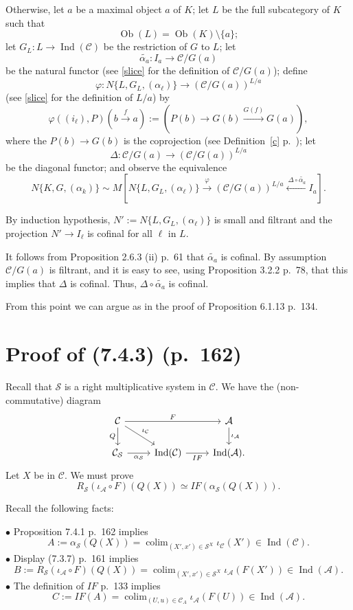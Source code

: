 \documentclass[12pt]{article}
\theoremstyle{remark}
\theoremstyle{definition}
\newcommand{\bu}{\bullet}
\newcommand{\A}{\mathcal A}
\newcommand{\C}{\mathcal C}
\newcommand{\SSS}{\mathcal S}
\newcommand{\xr}{\xrightarrow}
\newcommand{\cn}{(See (\ref{convnot}) p.~\pageref{convnot} for an explanation of the notation.) }
\DeclareMathOperator*{\coli}{colim}
\DeclareMathOperator{\Ind}{Ind}
\DeclareMathOperator{\Ob}{Ob}
\begin{document}
Otherwise, let $a$ be a maximal object $a$ of $K$; let $L$ be the full subcategory of $K$ such that 
$$
\Ob(L)=\Ob(K)\setminus\{a\};
$$ 
let $G_L:L\to\Ind(\C)$ be the restriction of $G$ to $L$; let 
$$
\widetilde{\alpha_a}:I_a\to\C/G(a)
$$ 
be the natural functor (see \eqref{slice} for the definition of $\C/G(a)$); define 
$$ 
\varphi:N\{L,G_L,(\alpha_\ell)\}\to(\C/G(a))^{L/a} 
$$ 
(see \eqref{slice} for the definition of $L/a$) by 
$$
\varphi((i_\ell),P)\left(b\xr f a\right):=\left(P(b)\to G(b)\xr{G(f)}G(a)\right),
$$
where the $P(b)\to G(b)$ is the coprojection (see Definition~\ref{c} p.~\pageref{c}); let 
$$
\Delta:\C/G(a)\to(\C/G(a))^{L/a}
$$ 
be the diagonal functor; and observe the equivalence 
$$ 
N\{K,G,(\alpha_k)\}\sim M\left[N\{L,G_L,(\alpha_\ell)\}\xrightarrow{\varphi}(\C/G(a))^{L/a}\xleftarrow{\ \Delta\circ\widetilde{\alpha_a}}I_a\right]. 
$$ 

By induction hypothesis, $N':=N\{L,G_L,(\alpha_\ell)\}$ is small and filtrant and the projection $N'\to I_\ell$ is cofinal for all $\ell$ in $L$. 

It follows from Proposition 2.6.3 (ii) p.~61 that $\widetilde{\alpha_a}$ is cofinal. By assumption $\C/G(a)$ is filtrant, and it is easy to see, using Proposition 3.2.2 p.~78, that this implies that $\Delta$ is cofinal. Thus, $\Delta\circ\widetilde{\alpha_a}$ is cofinal.

From this point we can argue as in the proof of Proposition 6.1.13 p.~134. 
%
\section{Proof of (7.4.3) (p.~162)} %
%
Recall that $\SSS$ is a right multiplicative system in $\C$. We have the (non-commutative) diagram
$$
\begin{tikzcd}
\C\ar{rr}{F}\ar{d}[swap]{Q}\ar{dr}{\iota_\C}&&\A\ar{d}{\iota_\A}\\ 
\C_\SSS\ar{r}[swap]{\alpha_\SSS}&\Ind(\C)\ar{r}[swap]{IF}&\Ind(\A).
\end{tikzcd}
$$
Let $X$ be in $\C$. We must prove 
$$
R_\SSS(\iota_\A\circ F)(Q(X))\simeq IF(\alpha_\SSS(Q(X))).
$$

Recall the following facts: 

\noindent$\bu$ Proposition 7.4.1 p.~162 implies
$$
A:=\alpha_\SSS(Q(X))=\coli_{(X',x')\in\SSS^X}\iota_\C(X')\in\Ind(\C).
$$ 
$\bu$ Display (7.3.7) p.~161 implies
$$
B:=R_\SSS(\iota_\A\circ F)(Q(X))=\coli_{(X',x')\in\SSS^X}\iota_\A(F(X'))\in\Ind(\A).
$$
$\bu$ The definition of $IF$ p.~133 implies
$$
C:=IF(A)=\coli_{(U,u)\in\C_A}\iota_\A(F(U))\in\Ind(\A).
$$ 
\end{document}
